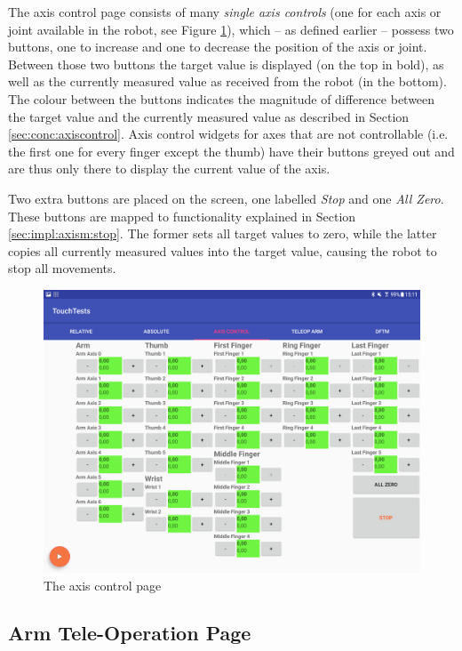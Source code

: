 The axis control page consists of many \textit{single axis controls} (one for each axis or joint available in the robot, see Figure \ref{fig:ui:axiscontrol}), which -- as defined earlier -- possess two buttons, one to increase and one to decrease the position of the axis or joint. Between those two buttons the target value is displayed (on the top in bold), as well as the currently measured value as received from the robot (in the bottom). The colour between the buttons indicates the magnitude of difference between the target value and the currently measured value as described in Section \ref{sec:conc:axiscontrol}. Axis control widgets for axes that are not controllable (i.e. the first one for every finger except the thumb) have their buttons greyed out and are thus only there to display the current value of the axis.

Two extra buttons are placed on the screen, one labelled \textit{Stop} and one \textit{All Zero}. These buttons are mapped to functionality explained in Section \ref{sec:impl:axism:stop}. The former sets all target values to zero, while the latter copies all currently measured values into the target value, causing the robot to stop all movements.

\begin{figure}
	\caption{\label{fig:ui:axiscontrol}The axis control page}
	\includegraphics[width=0.9\linewidth]{assets/chpt_impl/axis_control}
\end{figure}

\subsection{Arm Tele-Operation Page}
\label{sec:impl:armteleop}

